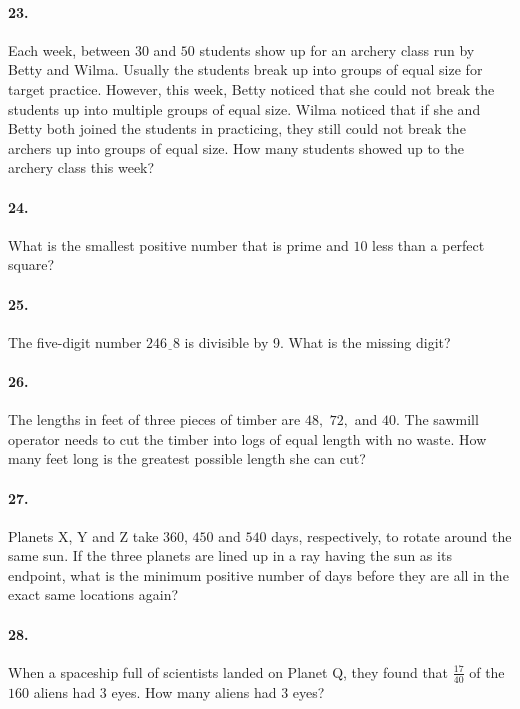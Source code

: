 \documentclass[16pt]{article}
\begin{document}
\paragraph{23. } Each week, between $30$ and $50$ students show up for an archery class run by Betty and Wilma. Usually the students break up into groups of equal size for target practice. However, this week, Betty noticed that she could not break the students up into multiple groups of equal size. Wilma noticed that if she and Betty both joined the students in practicing, they still could not break the archers up into groups of equal size. How many students showed up to the archery class this week?

\paragraph{24. } What is the smallest positive number that is prime and $10$ less than a perfect square?

\paragraph{25. } The five-digit number $246\underline{\hspace{5pt}}8$ is divisible by 9. What is the missing digit?

\paragraph{26. } The lengths in feet of three pieces of timber are $48,$ $72,$ and $40.$ The sawmill operator needs to cut the timber into logs of equal length with no waste. How many feet long is the greatest possible length she can cut?


\paragraph{27. } Planets X, Y and Z take $360$, $450$ and $540$ days, respectively, to rotate around the same sun. If the three planets are lined up in a ray having the sun as its endpoint, what is the minimum positive number of days before they are all in the exact same locations again?

\paragraph{28. } When a spaceship full of scientists landed on Planet Q, they found that $\frac{17}{40}$ of the $160$ aliens had $3$ eyes. How many aliens had $3$ eyes?
\end{document}
